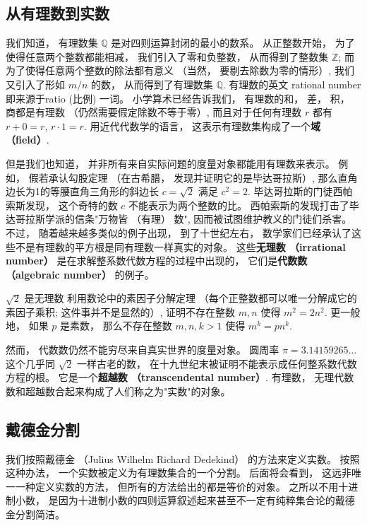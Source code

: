 
\subsection{从有理数到实数}

我们知道， 有理数集 $\mathbb{Q}$ 是对四则运算封闭的最小的数系。 从正整数开始， 为了使得任意两个整数都能相减， 我们引入了零和负整数， 从而得到了整数集 $\mathbb{Z}$; 而为了使得任意两个整数的除法都有意义 （当然， 要剔去除数为零的情形）, 我们又引入了形如 $m/n$ 的数， 从而得到了有理数集 $\mathbb{Q}$. 有理数的英文 rational number 即来源于ratio (比例) 一词。 小学算术已经告诉我们， 有理数的和， 差， 积， 商都是有理数 （仍然需要假定除数不等于零）, 而且对于任何有理数 $r$ 都有 $r+0=r$, $r\cdot1=r$. 用近代代数学的语言， 这表示有理数集构成了一个\textbf{域 （field）}.

但是我们也知道， 并非所有来自实际问题的度量对象都能用有理数来表示。 例如， 假若承认勾股定理 （在古希腊， 发现并证明它的是毕达哥拉斯）, 那么直角边长为1的等腰直角三角形的斜边长 $c=\sqrt{2}$ 满足 $c^2=2$. 毕达哥拉斯的门徒西帕索斯发现， 这个奇特的数 $c$ 不能表示为两个整数的比。 西帕索斯的发现打击了毕达哥拉斯学派的信条"万物皆 （有理） 数", 因而被试图维护教义的门徒们杀害。 不过， 随着越来越多类似的例子出现， 到了十世纪左右， 数学家们已经承认了这些不是有理数的平方根是同有理数一样真实的对象。 这些\textbf{无理数 （irrational number）} 是在求解整系数代数方程的过程中出现的， 它们是\textbf{代数数 （algebraic number）} 的例子。

\begin{exercise}{$\sqrt{2}$ 是无理数}
利用数论中的素因子分解定理 （每个正整数都可以唯一分解成它的素因子乘积; 这件事并不是显然的）, 证明不存在整数 $m,n$ 使得 $m^2=2n^2$. 更一般地， 如果 $p$ 是素数， 那么不存在整数 $m,n,k>1$ 使得 $m^k=pn^k$.
\end{exercise}

然而， 代数数仍然不能穷尽来自真实世界的度量对象。 圆周率 $\pi=3.14159265...$ 这个几乎同 $\sqrt{2}$ 一样古老的数， 在十九世纪末被证明不能表示成任何整系数代数方程的根。 它是一个\textbf{超越数 （transcendental number）}. 有理数， 无理代数数和超越数合起来构成了人们称之为"实数"的对象。

\subsection{戴德金分割}
我们按照戴德金 （Julius Wilhelm Richard Dedekind） 的方法来定义实数。 按照这种办法， 一个实数被定义为有理数集合的一个分割。 后面将会看到， 这远非唯一一种定义实数的方法， 但所有的方法给出的都是等价的对象。 之所以不用十进制小数， 是因为十进制小数的四则运算叙述起来甚至不一定有纯粹集合论的戴德金分割简洁。

